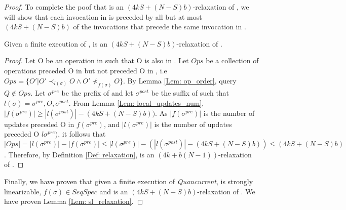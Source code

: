 \begin{proof}
To complete the poof that \fs is an \((4kS + (N-S)b)\)-relaxation of \ls, we will show that each invocation in \fs is preceded by all but at most \((4kS + (N-S)b)\) of the invocations that precede the same invocation in \ls.

\begin{lemma}\label{Lem: relaxation}
Given a finite execution \s of \mysketch, \fs is an \((4kS + (N-S)b)\)-relaxation of \ls.
\end{lemma}
\begin{proof}
Let O be an operation in \fs such that O is also in \ls. Let \(Ops\) be a collection of operations preceded O in \ls but not preceded O in \fs, i.e \( Ops=\{O'| O' \prec_{l(\sigma)} O \wedge  O' \nprec_{f(\sigma)} O \} \). By Lemma \ref{Lem: op_order}, query \( Q \notin Ops \). Let \(\sigma^{pre}\) be the prefix of \s and let \(\sigma^{post}\) be the suffix of \s such that \( l(\sigma)=\sigma^{pre},O,\sigma^{post} \). From Lemma \ref{Lem: local_updates_num}, \(|f(\sigma^{pre})| \ge |l(\sigma^{post})| - (4kS + (N-S)b))\). As \(|f(\sigma^{pre})|\) is the number of updates preceded O in \(f(\sigma^{pre})\), and \(|l(\sigma^{pre})|\) is the number of updates preceded O \(l\sigma^{pre})\), it follows that \(|Ops| = |l(\sigma^{pre})|-|f(\sigma^{pre})| \leq |l(\sigma^{pre})|-(|l(\sigma^{post})| - (4kS + (N-S)b))\leq (4kS + (N-S)b)\). Therefore, by Definition \ref{Def: relaxation}, \fs is an \((4k+b(N-1))\)-relaxation of \ls.
\end{proof}

Finally, we have proven that given a finite execution \s of \emph{Quancurrent}, \ls is strongly linearizable, \(f(\sigma) \in SeqSpec\) and \fs is an \((4kS + (N-S)b)\)-relaxation of \ls. We have proven Lemma \ref{Lem: sl_relaxation}.

\end{proof}
